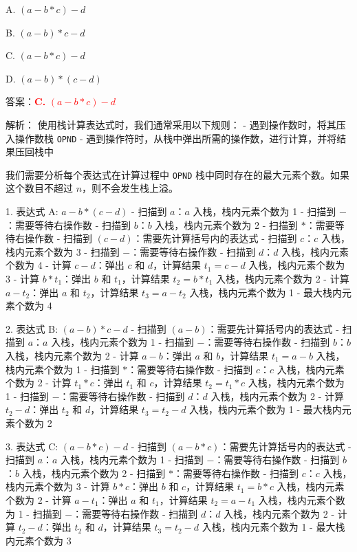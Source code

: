 \documentclass[lang=cn,newtx,10pt,scheme=chinese]{../../../elegantbook}
\begin{document}
\begin{enumerate}
    A. $(a - b * c) - d$  

    B. $(a - b) * c - d$  

    C. $(a - b * c) - d$  

    D. $(a - b) * (c - d)$  

    答案：\textcolor{red}{\textbf{C.} $(a - b * c) - d$}

    解析：
    使用栈计算表达式时，我们通常采用以下规则：
    - 遇到操作数时，将其压入操作数栈 \texttt{OPND}
    - 遇到操作符时，从栈中弹出所需的操作数，进行计算，并将结果压回栈中
    
    我们需要分析每个表达式在计算过程中 \texttt{OPND} 栈中同时存在的最大元素个数。如果这个数目不超过 $n$，则不会发生栈上溢。

    1. 表达式 A: $a - b * (c - d)$
       - 扫描到 $a$：$a$ 入栈，栈内元素个数为 1
       - 扫描到 $-$：需要等待右操作数
       - 扫描到 $b$：$b$ 入栈，栈内元素个数为 2
       - 扫描到 $*$：需要等待右操作数
       - 扫描到 $(c - d)$：需要先计算括号内的表达式
       - 扫描到 $c$：$c$ 入栈，栈内元素个数为 3
       - 扫描到 $-$：需要等待右操作数
       - 扫描到 $d$：$d$ 入栈，栈内元素个数为 4
       - 计算 $c - d$：弹出 $c$ 和 $d$，计算结果 $t_1 = c - d$ 入栈，栈内元素个数为 3
       - 计算 $b * t_1$：弹出 $b$ 和 $t_1$，计算结果 $t_2 = b * t_1$ 入栈，栈内元素个数为 2
       - 计算 $a - t_2$：弹出 $a$ 和 $t_2$，计算结果 $t_3 = a - t_2$ 入栈，栈内元素个数为 1
       - 最大栈内元素个数为 4

    2. 表达式 B: $(a - b) * c - d$
       - 扫描到 $(a - b)$：需要先计算括号内的表达式
       - 扫描到 $a$：$a$ 入栈，栈内元素个数为 1
       - 扫描到 $-$：需要等待右操作数
       - 扫描到 $b$：$b$ 入栈，栈内元素个数为 2
       - 计算 $a - b$：弹出 $a$ 和 $b$，计算结果 $t_1 = a - b$ 入栈，栈内元素个数为 1
       - 扫描到 $*$：需要等待右操作数
       - 扫描到 $c$：$c$ 入栈，栈内元素个数为 2
       - 计算 $t_1 * c$：弹出 $t_1$ 和 $c$，计算结果 $t_2 = t_1 * c$ 入栈，栈内元素个数为 1
       - 扫描到 $-$：需要等待右操作数
       - 扫描到 $d$：$d$ 入栈，栈内元素个数为 2
       - 计算 $t_2 - d$：弹出 $t_2$ 和 $d$，计算结果 $t_3 = t_2 - d$ 入栈，栈内元素个数为 1
       - 最大栈内元素个数为 2

    3. 表达式 C: $(a - b * c) - d$
       - 扫描到 $(a - b * c)$：需要先计算括号内的表达式
       - 扫描到 $a$：$a$ 入栈，栈内元素个数为 1
       - 扫描到 $-$：需要等待右操作数
       - 扫描到 $b$：$b$ 入栈，栈内元素个数为 2
       - 扫描到 $*$：需要等待右操作数
       - 扫描到 $c$：$c$ 入栈，栈内元素个数为 3
       - 计算 $b * c$：弹出 $b$ 和 $c$，计算结果 $t_1 = b * c$ 入栈，栈内元素个数为 2
       - 计算 $a - t_1$：弹出 $a$ 和 $t_1$，计算结果 $t_2 = a - t_1$ 入栈，栈内元素个数为 1
       - 扫描到 $-$：需要等待右操作数
       - 扫描到 $d$：$d$ 入栈，栈内元素个数为 2
       - 计算 $t_2 - d$：弹出 $t_2$ 和 $d$，计算结果 $t_3 = t_2 - d$ 入栈，栈内元素个数为 1
       - 最大栈内元素个数为 3


\end{enumerate}
\end{document}
